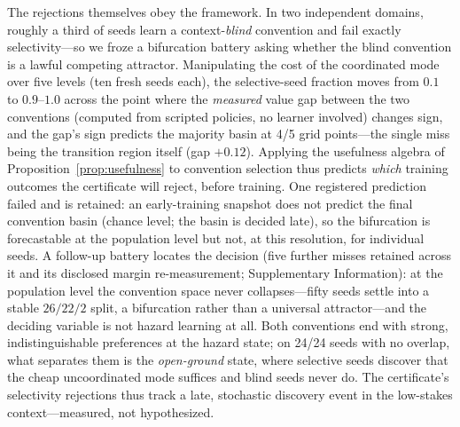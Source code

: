 \documentclass[11pt]{article}
\theoremstyle{definition}
\begin{document}
The rejections themselves obey the framework. In two independent
domains, roughly a third of seeds learn a context-\emph{blind}
convention and fail exactly selectivity---so we froze a bifurcation
battery asking whether the blind convention is a lawful competing
attractor. Manipulating the cost of the coordinated mode over five
levels (ten fresh seeds each), the selective-seed fraction moves from
$0.1$ to $0.9$--$1.0$ across the point where the \emph{measured} value
gap between the two conventions (computed from scripted policies,
no learner involved) changes sign, and the gap's sign predicts the
majority basin at 4/5 grid points---the single miss being the
transition region itself (gap $+0.12$). Applying the usefulness
algebra of Proposition~\ref{prop:usefulness} to convention selection
thus predicts \emph{which} training outcomes the certificate will
reject, before training. One registered prediction failed and is
retained: an early-training snapshot does not predict the final
convention basin (chance level; the basin is decided late), so the
bifurcation is forecastable at the population level but not, at this
resolution, for individual seeds. A follow-up battery locates the
decision (five further misses retained across it and its disclosed
margin re-measurement; Supplementary Information): at the population
level the convention space never collapses---fifty seeds settle into a
stable $26/22/2$ split, a bifurcation rather than a universal
attractor---and the deciding variable is not hazard learning at all.
Both conventions end with strong, indistinguishable preferences at the
hazard state; on 24/24 seeds with no overlap, what separates them is
the \emph{open-ground} state, where selective seeds discover that the
cheap uncoordinated mode suffices and blind seeds never do. The
certificate's selectivity rejections thus track a late, stochastic
discovery event in the low-stakes context---measured, not
hypothesized.
\end{document}
